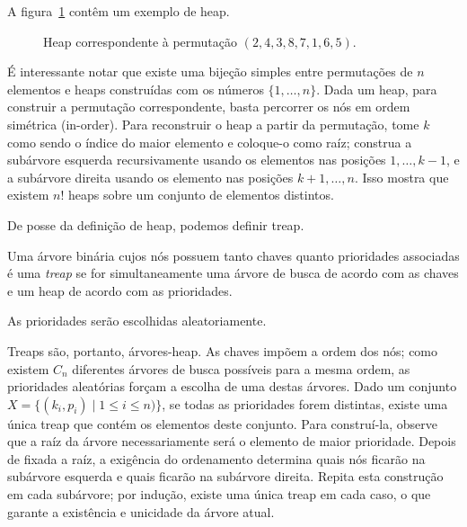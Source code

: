 A figura~\ref{fig:heap} contêm um exemplo de heap.
\begin{figure}[h]
    \centering
    \caption{Heap correspondente à permutação $(2, 4, 3, 8, 7, 1, 6, 5)$.}
    \label{fig:heap}
\end{figure}
É interessante notar que existe uma bijeção simples entre
permutações de $n$ elementos e heaps construídas com os números $\{1, \dots, n\}$.
Dada um heap, para construir a permutação correspondente,
basta percorrer os nós em ordem simétrica (in-order).
Para reconstruir o heap a partir da permutação,
tome $k$ como sendo o índice do maior elemento e coloque-o como raíz;
construa a subárvore esquerda recursivamente
usando os elementos nas posições $1, \dots, k-1$,
e a subárvore direita usando os elemento nas posições $k+1, \dots, n$.
Isso mostra que existem $n!$ heaps sobre um conjunto de elementos distintos.

De posse da definição de heap,
podemos definir treap.

\begin{definition}
    Uma árvore binária cujos nós possuem tanto chaves quanto prioridades associadas
    é uma \emph{treap}
    se for simultaneamente uma árvore de busca de acordo com as chaves
    e um heap de acordo com as prioridades.
\end{definition}

As prioridades serão escolhidas aleatoriamente.

Treaps são, portanto, árvores-heap.
As chaves impõem a ordem dos nós;
como existem $C_n$ diferentes árvores de busca possíveis para a mesma ordem,
as prioridades aleatórias forçam a escolha de uma destas árvores.
Dado um conjunto $X = \{ (k_i, p_i) \mid 1 \leq i \leq n) \}$,
se todas as prioridades forem distintas,
existe uma única treap que contém os elementos deste conjunto.
Para construí-la,
observe que a raíz da árvore necessariamente será o elemento de maior prioridade.
Depois de fixada a raíz,
a exigência do ordenamento determina quais nós ficarão na subárvore esquerda
e quais ficarão na subárvore direita.
Repita esta construção em cada subárvore;
por indução, existe uma única treap em cada caso,
o que garante a existência e unicidade da árvore atual.


